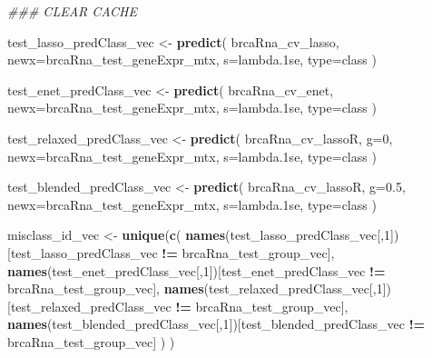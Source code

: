 \documentclass[
]{book}
\newenvironment{Shaded}{\begin{snugshade}}{\end{snugshade}}
\newcommand{\CommentTok}[1]{\textcolor[rgb]{0.56,0.35,0.01}{\textit{#1}}}
\newcommand{\DataTypeTok}[1]{\textcolor[rgb]{0.13,0.29,0.53}{#1}}
\newcommand{\DecValTok}[1]{\textcolor[rgb]{0.00,0.00,0.81}{#1}}
\newcommand{\FloatTok}[1]{\textcolor[rgb]{0.00,0.00,0.81}{#1}}
\newcommand{\KeywordTok}[1]{\textcolor[rgb]{0.13,0.29,0.53}{\textbf{#1}}}
\newcommand{\NormalTok}[1]{#1}
\newcommand{\OperatorTok}[1]{\textcolor[rgb]{0.81,0.36,0.00}{\textbf{#1}}}
\newcommand{\StringTok}[1]{\textcolor[rgb]{0.31,0.60,0.02}{#1}}
\begin{document}
\begin{Shaded}
\begin{Highlighting}[]
\CommentTok{\#\#\# CLEAR CACHE}

\NormalTok{test\_lasso\_predClass\_vec <{-}}\StringTok{ }\KeywordTok{predict}\NormalTok{(}
\NormalTok{ brcaRna\_cv\_lasso,}
 \DataTypeTok{newx=}\NormalTok{brcaRna\_test\_geneExpr\_mtx,}
 \DataTypeTok{s=}\StringTok{\textquotesingle{}lambda.1se\textquotesingle{}}\NormalTok{,}
 \DataTypeTok{type=}\StringTok{\textquotesingle{}class\textquotesingle{}}
\NormalTok{)}

\NormalTok{test\_enet\_predClass\_vec <{-}}\StringTok{ }\KeywordTok{predict}\NormalTok{(}
\NormalTok{ brcaRna\_cv\_enet,}
 \DataTypeTok{newx=}\NormalTok{brcaRna\_test\_geneExpr\_mtx,}
 \DataTypeTok{s=}\StringTok{\textquotesingle{}lambda.1se\textquotesingle{}}\NormalTok{,}
 \DataTypeTok{type=}\StringTok{\textquotesingle{}class\textquotesingle{}}
\NormalTok{)}

\NormalTok{test\_relaxed\_predClass\_vec <{-}}\StringTok{ }\KeywordTok{predict}\NormalTok{(}
\NormalTok{ brcaRna\_cv\_lassoR,}
 \DataTypeTok{g=}\DecValTok{0}\NormalTok{,}
 \DataTypeTok{newx=}\NormalTok{brcaRna\_test\_geneExpr\_mtx,}
 \DataTypeTok{s=}\StringTok{\textquotesingle{}lambda.1se\textquotesingle{}}\NormalTok{,}
 \DataTypeTok{type=}\StringTok{\textquotesingle{}class\textquotesingle{}}
\NormalTok{)}

\NormalTok{test\_blended\_predClass\_vec <{-}}\StringTok{ }\KeywordTok{predict}\NormalTok{(}
\NormalTok{ brcaRna\_cv\_lassoR,}
 \DataTypeTok{g=}\FloatTok{0.5}\NormalTok{,}
 \DataTypeTok{newx=}\NormalTok{brcaRna\_test\_geneExpr\_mtx,}
 \DataTypeTok{s=}\StringTok{\textquotesingle{}lambda.1se\textquotesingle{}}\NormalTok{,}
 \DataTypeTok{type=}\StringTok{\textquotesingle{}class\textquotesingle{}}
\NormalTok{)}

\NormalTok{misclass\_id\_vec <{-}}\StringTok{ }\KeywordTok{unique}\NormalTok{(}\KeywordTok{c}\NormalTok{(}
 \KeywordTok{names}\NormalTok{(test\_lasso\_predClass\_vec[,}\DecValTok{1}\NormalTok{])[test\_lasso\_predClass\_vec }\OperatorTok{!=}\StringTok{ }\NormalTok{brcaRna\_test\_group\_vec],}
 \KeywordTok{names}\NormalTok{(test\_enet\_predClass\_vec[,}\DecValTok{1}\NormalTok{])[test\_enet\_predClass\_vec }\OperatorTok{!=}\StringTok{ }\NormalTok{brcaRna\_test\_group\_vec],}
 \KeywordTok{names}\NormalTok{(test\_relaxed\_predClass\_vec[,}\DecValTok{1}\NormalTok{])[test\_relaxed\_predClass\_vec }\OperatorTok{!=}\StringTok{ }\NormalTok{brcaRna\_test\_group\_vec],}
 \KeywordTok{names}\NormalTok{(test\_blended\_predClass\_vec[,}\DecValTok{1}\NormalTok{])[test\_blended\_predClass\_vec }\OperatorTok{!=}\StringTok{ }\NormalTok{brcaRna\_test\_group\_vec]}
\NormalTok{ )}
\NormalTok{)}



\end{Highlighting}
\end{Shaded}
\end{document}

